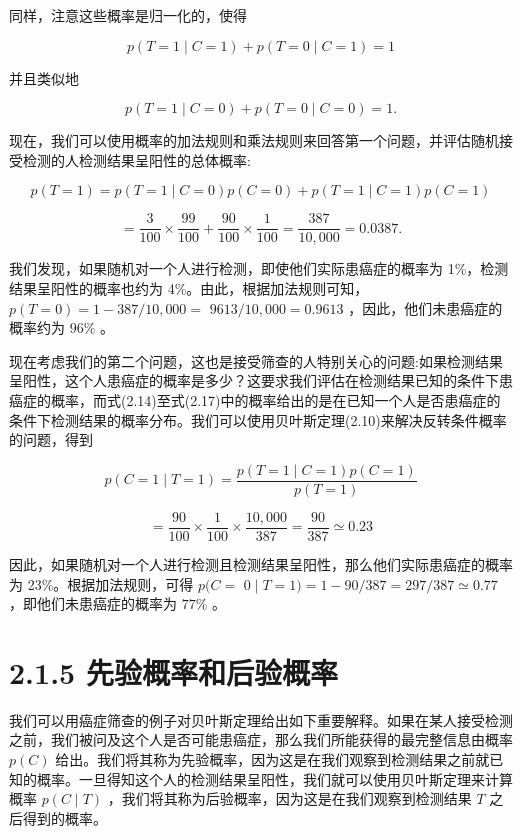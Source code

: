 \documentclass[10pt]{report}
\begin{document}
同样，注意这些概率是归一化的，使得

\[
p\left( {T = 1 \mid  C = 1}\right)  + p\left( {T = 0 \mid  C = 1}\right)  = 1 \tag{2.18}
\]

并且类似地

\[
p\left( {T = 1 \mid  C = 0}\right)  + p\left( {T = 0 \mid  C = 0}\right)  = 1. \tag{2.19}
\]

现在，我们可以使用概率的加法规则和乘法规则来回答第一个问题，并评估随机接受检测的人检测结果呈阳性的总体概率:

\[
p\left( {T = 1}\right)  = p\left( {T = 1 \mid  C = 0}\right) p\left( {C = 0}\right)  + p\left( {T = 1 \mid  C = 1}\right) p\left( {C = 1}\right)
\]

\[
= \frac{3}{100} \times  \frac{99}{100} + \frac{90}{100} \times  \frac{1}{100} = \frac{387}{{10},{000}} = {0.0387}. \tag{2.20}
\]

我们发现，如果随机对一个人进行检测，即使他们实际患癌症的概率为 1\%，检测结果呈阳性的概率也约为 4\%。由此，根据加法规则可知， \(p\left( {T = 0}\right)  = 1 - {387}/{10},{000} =\)  \({9613}/{10},{000} = {0.9613}\) ，因此，他们未患癌症的概率约为 \({96}\%\) 。

现在考虑我们的第二个问题，这也是接受筛查的人特别关心的问题:如果检测结果呈阳性，这个人患癌症的概率是多少？这要求我们评估在检测结果已知的条件下患癌症的概率，而式(2.14)至式(2.17)中的概率给出的是在已知一个人是否患癌症的条件下检测结果的概率分布。我们可以使用贝叶斯定理(2.10)来解决反转条件概率的问题，得到

\[
p\left( {C = 1 \mid  T = 1}\right)  = \frac{p\left( {T = 1 \mid  C = 1}\right) p\left( {C = 1}\right) }{p\left( {T = 1}\right) } \tag{2.21}
\]

\[
= \frac{90}{100} \times  \frac{1}{100} \times  \frac{{10},{000}}{387} = \frac{90}{387} \simeq  {0.23} \tag{2.22}
\]

因此，如果随机对一个人进行检测且检测结果呈阳性，那么他们实际患癌症的概率为 23\%。根据加法规则，可得 \(p(C =\)  \(0 \mid  T = 1) = 1 - {90}/{387} = {297}/{387} \simeq  {0.77}\) ，即他们未患癌症的概率为 \({77}\%\) 。

\section*{2.1.5 先验概率和后验概率}

我们可以用癌症筛查的例子对贝叶斯定理给出如下重要解释。如果在某人接受检测之前，我们被问及这个人是否可能患癌症，那么我们所能获得的最完整信息由概率 \(p\left( C\right)\) 给出。我们将其称为先验概率，因为这是在我们观察到检测结果之前就已知的概率。一旦得知这个人的检测结果呈阳性，我们就可以使用贝叶斯定理来计算概率 \(p\left( {C \mid  T}\right)\) ，我们将其称为后验概率，因为这是在我们观察到检测结果 \(T\) 之后得到的概率。
\end{document}
